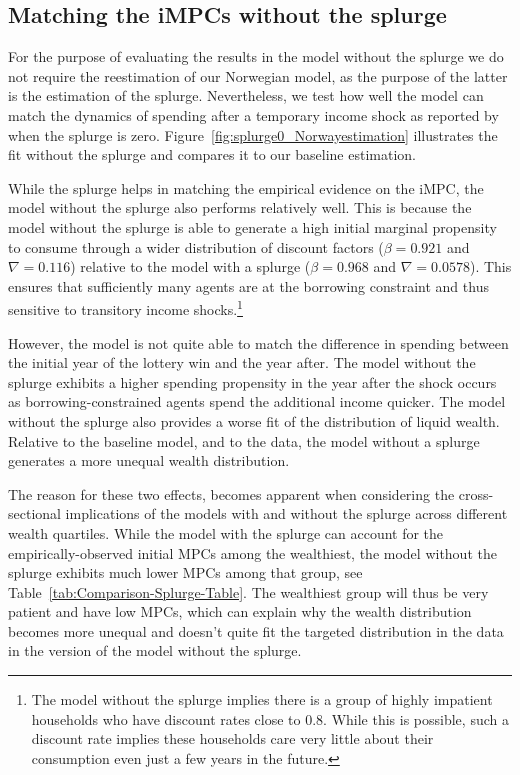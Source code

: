 \documentclass[\latexroot/\projectname]{subfiles}
\begin{document}
\subsection{Matching the iMPCs without the splurge}
\whenintegrated{\label{app:nosplurge-matching-impcs}} %

For the purpose of evaluating the results in the model without the splurge we do not require the reestimation of our Norwegian model, as the purpose of the latter is the estimation of the splurge. Nevertheless, we test how well the model can match the dynamics of spending after a temporary income shock as reported by~\cite{fagereng-mpc-2021} when the splurge is zero.
Figure~\ref{fig:splurge0_Norwayestimation} illustrates the fit without the splurge and compares it to our baseline estimation.



While the splurge helps in matching the empirical evidence on the iMPC, the model without the splurge also performs relatively well. This is because the model without the splurge is able to generate a high initial marginal propensity to consume through a wider distribution of discount factors ($\beta = 0.921$ and $\nabla=0.116$) relative to the model with a splurge ($\beta = 0.968$ and $\nabla=0.0578$). This ensures that sufficiently many agents are at the borrowing constraint and thus sensitive to transitory income shocks.\footnote{The model without the splurge implies there is a group of highly impatient households who have discount rates close to 0.8. While this is possible, such a discount rate implies these households care very little about their consumption even just a few years in the future.}

However, the model is not quite able to match the difference in spending between the initial year of the lottery win and the year after.
The model without the splurge exhibits a higher spending propensity in the year after the shock occurs as borrowing-constrained agents spend the additional income quicker.
The model without the splurge also provides a worse fit of the distribution of liquid wealth.
Relative to the baseline model, and to the data, the model without a splurge generates a more unequal wealth distribution.

The reason for these two effects, becomes apparent when considering the cross-sectional implications of the models with and without the splurge across different wealth quartiles.
While the model with the splurge can account for the empirically-observed initial MPCs among the wealthiest, the model without the splurge exhibits much lower MPCs among that group, see Table~\ref{tab:Comparison-Splurge-Table}. The wealthiest group will thus be very patient and have low MPCs, which can explain why the wealth distribution becomes more unequal and doesn't quite fit the targeted distribution in the data in the version of the model without the splurge.
\end{document}
